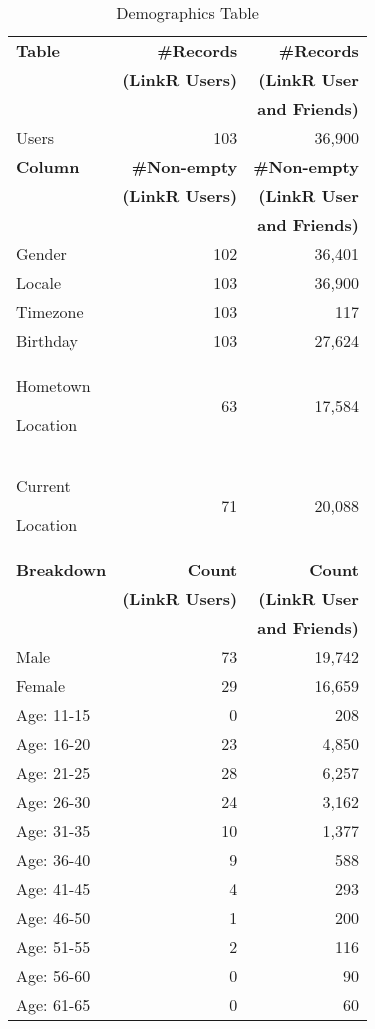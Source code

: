 \documentclass[letterpaper]{article}
\begin{document}
\begin{table}[h!]
\centering
\caption{\small Demographics Table}
\label{tab:demographics}
\begin{tabular}{|>{\small}p{2cm}|>{\small}r|>{\small}r|}
\hline
\textbf{Table} & \textbf{\#Records} & \textbf{\#Records} \\
& \textbf{(LinkR Users)} & \textbf{(LinkR User} \\
& & \textbf{and Friends)} \\
\hline
Users & 103 & 36,900 \\
\hline
\hline
\textbf{Column} & \textbf{\#Non-empty} & \textbf{\#Non-empty} \\
& \textbf{(LinkR Users)} & \textbf{(LinkR User} \\
& & \textbf{and Friends)} \\
\hline
Gender & 102 & 36,401 \\
\hline
Locale & 103 & 36,900 \\
\hline
Timezone & 103 & 117 \\
\hline
Birthday & 103 & 27,624 \\
\hline
Hometown\par Location & 63 & 17,584 \\
\hline
Current\par Location & 71 & 20,088 \\
\hline
\hline
\textbf{Breakdown} & \textbf{Count} & \textbf{Count} \\
& \textbf{(LinkR Users)} & \textbf{(LinkR User} \\
& & \textbf{and Friends)} \\
\hline
Male & 73 & 19,742 \\
\hline
Female & 29 & 16,659 \\
\hline
Age: 11-15 & 0 & 208 \\
\hline
Age: 16-20 & 23 & 4,850 \\
\hline
Age: 21-25 & 28 & 6,257 \\
\hline
Age: 26-30 & 24 & 3,162 \\
\hline
Age: 31-35 & 10 & 1,377 \\
\hline
Age: 36-40 & 9 & 588 \\
\hline
Age: 41-45 & 4 & 293 \\
\hline
Age: 46-50 & 1 & 200 \\
\hline
Age: 51-55 & 2 & 116 \\
\hline
Age: 56-60 & 0 & 90 \\
\hline
Age: 61-65 & 0 & 60 \\

\end{tabular}
\end{table}
\end{document}

